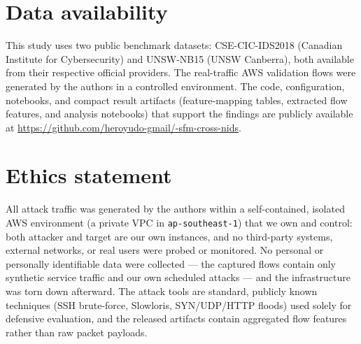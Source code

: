 \documentclass[preprint,12pt,authoryear]{elsarticle}
\begin{document}
\section*{Data availability}
This study uses two public benchmark datasets: CSE-CIC-IDS2018 (Canadian Institute
for Cybersecurity) and UNSW-NB15 (UNSW Canberra), both available from their
respective official providers. The real-traffic AWS validation flows were
generated by the authors in a controlled environment. The code, configuration,
notebooks, and compact result artifacts (feature-mapping tables, extracted flow
features, and analysis notebooks) that support the findings are publicly available
at \url{https://github.com/heroyudo-gmail/-sfm-cross-nids}.

\section*{Ethics statement}
All attack traffic was generated by the authors within a self-contained, isolated
AWS environment (a private VPC in \texttt{ap-southeast-1}) that we own and control:
both attacker and target are our own instances, and no third-party systems,
external networks, or real users were probed or monitored. No personal or
personally identifiable data were collected --- the captured flows contain only
synthetic service traffic and our own scheduled attacks --- and the infrastructure
was torn down afterward. The attack tools are standard, publicly known techniques
(SSH brute-force, Slowloris, SYN/UDP/HTTP floods) used solely for defensive
evaluation, and the released artifacts contain aggregated flow features rather than
raw packet payloads.
\end{document}
